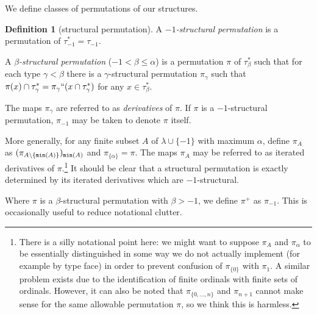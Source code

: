 \documentclass[112pt]{article}
\theoremstyle{definition}
\newtheorem{definition}[theorem]{Definition}
\theoremstyle{remark}
\newcommand{\rk}[1]{{\color{blue}\sl #1}}
\newcommand{\hsuggest}[1]{{\color{magenta}#1}}
\begin{document}
We define classes of permutations of our structures.
\begin{definition}[structural permutation]\label{def:structural_permutation}
A {\em $-1$-structural permutation\/} is a permutation of $\tau_{-1}^* = \tau_{-1}$.

A {\em $\beta$-structural permutation\/} ($-1 < \beta \leq \alpha$) is a permutation $\pi$ of $\tau_\beta^*$ such that for each type $\gamma<\beta$ there is a $\gamma$-structural permutation
$\pi_\gamma$ such that $\pi(x) \cap \tau^*_\gamma = \pi_\gamma``(x \cap \tau^*_\gamma)$ for any $x \in \tau^*_\beta$.

The maps $\pi_\gamma$ are referred to as {\em derivatives\/} of $\pi$.  {If $\pi$ is a $-1$-structural permutation, $\pi_{-1}$ may be taken to denote $\pi$ itself.}

More generally, for any finite subset $A$ of $\lambda \cup \{-1\}$ with maximum $\alpha$,
define $\pi_A$ as $(\pi_{A \setminus \{{\tt min}(A)\}})_{{\tt min}(A)}$ {and $\pi_{\{\alpha\}} = \pi$}.  The maps $\pi_A$ may be referred to as iterated derivatives of $\pi$.\footnote{There is a silly notational point here:  we might want to suppose $\pi_A$ and $\pi_\alpha$ to be essentially distinguished in some way we do not actually implement (for example by type face) in order to prevent confusion of $\pi_{\{0\}}$ with $\pi_1$.  A similar problem exists due to the identification of finite ordinals with finite sets of ordinals.  However, it can also be noted that $\pi_{\{0,\ldots,n\}}$ and $\pi_{n+1}$ cannot make sense for the same allowable permutation $\pi$, so we think this is harmless.}  It should be clear that a structural permutation is exactly determined by its iterated derivatives which are $-1$-structural.

Where $\pi$ is a $\beta$-structural permutation with $\beta>-1$, we define $\pi^+$ as $\pi_{-1}$.  This is occasionally useful to reduce notational clutter.
\end{definition}

\begin{comment}
 \marginpar{\hsuggest{At first I thought this notation would be omitted, but in fact it remains useful.   It may now be OMITTABLE, revisit this.  It is still used with ordinal subscripts and I added the definition.}} We introduce the brief notation $\pi^+_A(x) = \pi_{A \cup \{-1\}}(x)$ where $x \in \tau_{-1}$ and $-1 \not\in A$ [in fact, $\pi^+_A = (\pi_A)_{-1}$, but we find the short notation useful, though it is less often used than in earlier versions] and also $\pi_\delta^+ = (\pi_\delta)_{-1}$ for $\delta\in \lambda$.
\end{comment}
\end{document}
